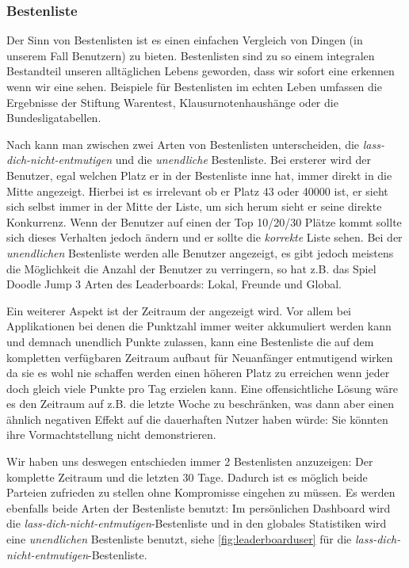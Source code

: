 \documentclass[12pt,twoside]{book}
\begin{document}
\subsubsection{Bestenliste}

Der Sinn von Bestenlisten ist es einen einfachen Vergleich von Dingen (in unserem Fall Benutzern) zu bieten. Bestenlisten sind zu so einem integralen Bestandteil unseren alltäglichen Lebens geworden, dass wir sofort eine erkennen wenn wir eine sehen. Beispiele für Bestenlisten im echten Leben umfassen die Ergebnisse der Stiftung Warentest, Klausurnotenhaushänge oder die Bundesligatabellen.

Nach \citep{zichermann2011gamification, 50 - 51} kann man zwischen zwei Arten von Bestenlisten unterscheiden, die \textit{lass-dich-nicht-entmutigen} und die \textit{unendliche} Bestenliste. Bei ersterer wird der Benutzer, egal welchen Platz er in der Bestenliste inne hat, immer direkt in die Mitte angezeigt. Hierbei ist es irrelevant ob er Platz 43 oder 40000 ist, er sieht sich selbst immer in der Mitte der Liste, um sich herum sieht er seine direkte Konkurrenz. Wenn der Benutzer auf einen der Top 10/20/30 Plätze kommt sollte sich dieses Verhalten jedoch ändern und er sollte die \textit{korrekte} Liste sehen.
Bei der \textit{unendlichen} Bestenliste werden alle Benutzer angezeigt, es gibt jedoch meistens die Möglichkeit die Anzahl der Benutzer zu verringern, so hat z.B. das Spiel Doodle Jump 3 Arten des Leaderboards: Lokal, Freunde und Global.

Ein weiterer Aspekt ist der Zeitraum der angezeigt wird. Vor allem bei Applikationen bei denen die Punktzahl immer weiter akkumuliert werden kann und demnach unendlich Punkte zulassen, kann eine Bestenliste die auf dem kompletten verfügbaren Zeitraum aufbaut für Neuanfänger entmutigend wirken da sie es wohl nie schaffen werden einen höheren Platz zu erreichen wenn jeder doch gleich viele Punkte pro Tag erzielen kann.
Eine offensichtliche Lösung wäre es den Zeitraum auf z.B. die letzte Woche zu beschränken, was dann aber einen ähnlich negativen Effekt auf die dauerhaften Nutzer haben würde: Sie könnten ihre Vormachtstellung nicht demonstrieren.

Wir haben uns deswegen entschieden immer 2 Bestenlisten anzuzeigen: Der komplette Zeitraum und die letzten 30 Tage. Dadurch ist es möglich beide Parteien zufrieden zu stellen ohne Kompromisse eingehen zu müssen. Es werden ebenfalls beide Arten der Bestenliste benutzt: Im persönlichen Dashboard wird die \textit{lass-dich-nicht-entmutigen}-Bestenliste und in den globales Statistiken wird eine \textit{unendlichen} Bestenliste benutzt, siehe \ref{fig:leaderboarduser} für die \textit{lass-dich-nicht-entmutigen}-Bestenliste.
\end{document}
